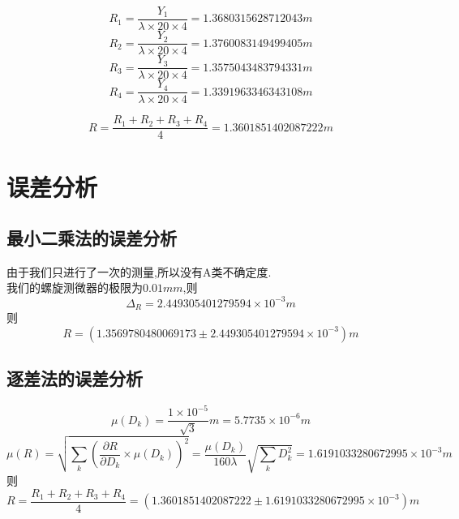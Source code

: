 \documentclass[10pt, a4paper]{article}
\begin{document}
	 \[R_1 = \frac{Y_1}{\lambda\times20\times4} = 1.3680315628712043m\]
	 \[R_2 = \frac{Y_2}{\lambda\times20\times4} = 1.3760083149499405m\]
	 \[R_3 = \frac{Y_3}{\lambda\times20\times4} = 1.3575043483794331m\]
	 \[R_4 = \frac{Y_4}{\lambda\times20\times4} = 1.3391963346343108m\]
	 
	 \[R = \frac{R_1+R_2+R_3+R_4}{4}=1.3601851402087222m\]
	 
	 \section{误差分析}
	 \subsection{最小二乘法的误差分析}
	 由于我们只进行了一次的测量,所以没有A类不确定度.\\
	 我们的螺旋测微器的极限为$0.01mm$,则\[\Delta_{R}  =2.449305401279594\times10^{-3}m
	  \]
	 则 \[R = (1.3569780480069173\pm2.449305401279594\times10^{-3})m\]
	 
	 \subsection{逐差法的误差分析}
	 \[\mu(D_k) = \frac{1\times10^{-5}}{\sqrt{3}}m = 5.7735\times10^{-6}m\]
	 \[\mu(R)=\sqrt{\sum_k(\frac{\partial R}{\partial D_k}\times\mu(D_k))^2}=\frac{\mu(D_k)}{160\lambda}\sqrt{\sum_k D_k^2}=1.6191033280672995\times10^{-3}m\]
	 则\[R =\frac{R_1+R_2+R_3+R_4}{4}=(1.3601851402087222\pm1.6191033280672995\times10^{-3})m\]
\end{document}
